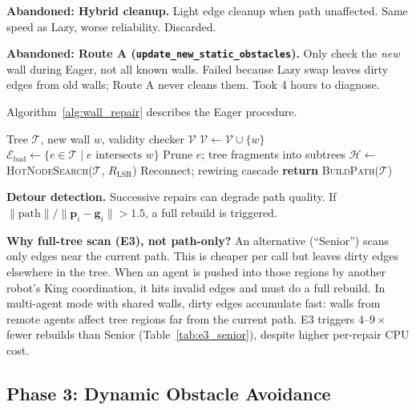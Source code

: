 \documentclass[letterpaper, 10pt, conference]{IEEEtran}
\begin{document}
\textbf{Abandoned: Hybrid cleanup.} Light edge cleanup when path unaffected. Same speed as Lazy, worse reliability. Discarded.

\textbf{Abandoned: Route A (\texttt{update\_new\_static\_obstacles}).} Only check the \emph{new} wall during Eager, not all known walls. Failed because Lazy swap leaves dirty edges from old walls; Route A never cleans them. Took 4 hours to diagnose.

Algorithm~\ref{alg:wall_repair} describes the Eager procedure.

\begin{algorithm}[t]
\caption{Incremental Wall Repair (\texttt{update\_static\_obstacles})}
\label{alg:wall_repair}
\begin{algorithmic}[1]
\REQUIRE Tree $\mathcal{T}$, new wall $w$, validity checker $\mathcal{V}$
\STATE $\mathcal{V} \leftarrow \mathcal{V} \cup \{w\}$
\STATE $\mathcal{E}_{\text{bad}} \leftarrow \{e \in \mathcal{T} \mid e \text{ intersects } w\}$ 
    \STATE Prune $e$; tree fragments into subtrees
\ENDFOR
\STATE $\mathcal{H} \leftarrow$ \textsc{HotNodeSearch}($\mathcal{T}$, $R_{\text{LSR}}$)
        \STATE Reconnect; rewiring cascade
    \ENDIF
\ENDFOR
\STATE \textbf{return} \textsc{BuildPath}($\mathcal{T}$)
\end{algorithmic}
\end{algorithm}

\textbf{Detour detection.} Successive repairs can degrade path quality. If $\|\text{path}\| / \|\mathbf{p}_i - \mathbf{g}_i\| > 1.5$, a full rebuild is triggered.

\textbf{Why full-tree scan (E3), not path-only?} An alternative (``Senior'') scans only edges near the current path. This is cheaper per call but leaves dirty edges elsewhere in the tree. When an agent is pushed into those regions by another robot's King coordination, it hits invalid edges and must do a full rebuild. In multi-agent mode with shared walls, dirty edges accumulate fast: walls from remote agents affect tree regions far from the current path. E3 triggers $4$--$9\times$ fewer rebuilds than Senior (Table~\ref{tab:e3_senior}), despite higher per-repair CPU cost.

\subsection{Phase 3: Dynamic Obstacle Avoidance}
\end{document}
